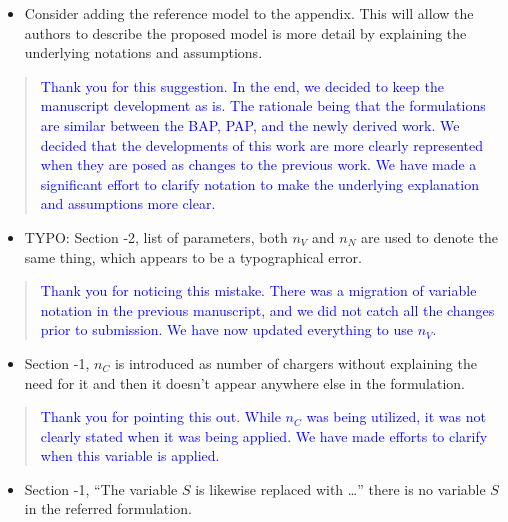 \documentclass[11pt,a4paper,final]{article}
\begin{document}
\begin{itemize}
\item Consider adding the reference model to the appendix. This will allow the authors to describe the proposed model is more detail by explaining the underlying notations and assumptions.
\end{itemize}

\begin{quote}
\textcolor{blue}{Thank you for this suggestion. In the end, we decided to keep the manuscript development as is. The rationale being that the formulations are similar between the BAP, PAP, and the newly derived work. We decided that the developments of this work are more clearly represented when they are posed as changes to the previous work. We have made a significant effort to clarify notation to make the underlying explanation and assumptions more clear.}
\end{quote}

\begin{itemize}
\item TYPO: Section -2, list of parameters, both \(n_V\) and \(n_N\) are used to denote the same thing, which appears to be a typographical error.
\end{itemize}

\begin{quote}
\textcolor{blue}{Thank you for noticing this mistake. There was a migration of variable notation in the previous manuscript, and we did not catch all the changes prior to submission. We have now updated everything to use $n_V$.}
\end{quote}

\begin{itemize}
\item Section -1, \(n_C\) is introduced as number of chargers without explaining the need for it and then it doesn’t appear anywhere else in the formulation.
\end{itemize}

\begin{quote}
\textcolor{blue}{Thank you for pointing this out. While $n_C$ was being utilized, it was not clearly stated when it was being applied. We have made efforts to clarify when this variable is applied.}
\end{quote}

\begin{itemize}
\item Section -1, “The variable \(S\) is likewise replaced with …” there is no variable \(S\) in the referred formulation.
\end{itemize}
\end{document}
